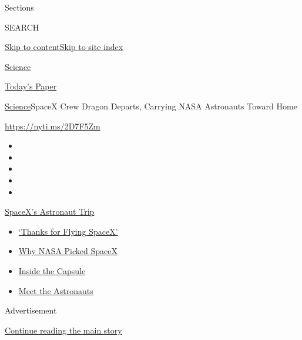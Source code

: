 Sections

SEARCH

\protect\hyperlink{site-content}{Skip to
content}\protect\hyperlink{site-index}{Skip to site index}

\href{https://www.nytimes.com/section/science}{Science}

\href{https://myaccount.nytimes.com/auth/login?response_type=cookie\&client_id=vi}{}

\href{https://www.nytimes.com/section/todayspaper}{Today's Paper}

\href{/section/science}{Science}\textbar{}SpaceX Crew Dragon Departs,
Carrying NASA Astronauts Toward Home

\url{https://nyti.ms/2D7F5Zm}

\begin{itemize}
\item
\item
\item
\item
\item
\end{itemize}

\href{https://www.nytimes.com/2020/08/02/science/spacex-astronauts-splashdown.html?action=click\&pgtype=Article\&state=default\&region=TOP_BANNER\&context=storylines_menu}{SpaceX's
Astronaut Trip}

\begin{itemize}
\tightlist
\item
  \href{https://www.nytimes.com/2020/08/02/science/spacex-astronauts-splashdown.html?action=click\&pgtype=Article\&state=default\&region=TOP_BANNER\&context=storylines_menu}{`Thanks
  for Flying SpaceX'}
\item
  \href{https://www.nytimes.com/2020/05/26/science/spacex-launch-nasa.html?action=click\&pgtype=Article\&state=default\&region=TOP_BANNER\&context=storylines_menu}{Why
  NASA Picked SpaceX}
\item
  \href{https://www.nytimes.com/interactive/2020/05/26/science/spacex-nasa.html?action=click\&pgtype=Article\&state=default\&region=TOP_BANNER\&context=storylines_menu}{Inside
  the Capsule}
\item
  \href{https://www.nytimes.com/2020/05/27/science/bob-behnken-doug-hurley.html?action=click\&pgtype=Article\&state=default\&region=TOP_BANNER\&context=storylines_menu}{Meet
  the Astronauts}
\end{itemize}

Advertisement

\protect\hyperlink{after-top}{Continue reading the main story}

